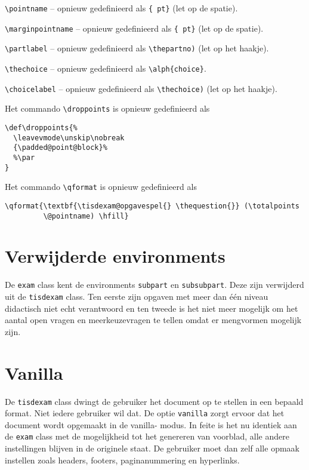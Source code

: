 \documentclass[12pt,dutch,addpoints,fleqn]{tisdexam}
\newcommand\Package[1]{\texttt{#1}}
\newcommand\DocClass[1]{\texttt{#1}}
\newcommand\Option[1]{\texttt{#1}}
\begin{document}
\verb|\pointname| -- opnieuw gedefinieerd als \verb|{ pt}| (let op de spatie).

\verb|\marginpointname| -- opnieuw gedefinieerd als \verb|{ pt}| (let op de spatie).

\verb|\partlabel| -- opnieuw gedefinieerd als \verb|\thepartno)| (let op het haakje).

\verb|\thechoice| -- opnieuw gedefinieerd als \verb|\alph{choice}|.

\verb|\choicelabel| -- opnieuw gedefinieerd als \verb|\thechoice)| (let op het haakje).

\medskip\noindent
Het commando \verb|\droppoints| is opnieuw gedefinieerd als

\begin{lstlisting}
\def\droppoints{%
  \leavevmode\unskip\nobreak
  {\padded@point@block}%
  %\par
}
\end{lstlisting}

\medskip\noindent
Het commando \verb|\qformat| is opnieuw gedefinieerd als

\begin{lstlisting}
\qformat{\textbf{\tisdexam@opgavespel{} \thequestion{}} (\totalpoints
         \@pointname) \hfill}
\end{lstlisting}


\section{Verwijderde environments}
De \DocClass{exam} class kent de environments \Package{subpart} en
\Package{subsubpart}. Deze zijn verwijderd uit de \DocClass{tisdexam} class.
Ten eerste zijn opgaven met meer dan \'{e}\'{e}n niveau didactisch niet
echt verantwoord en ten tweede is het niet meer mogelijk om het aantal
open vragen en meerkeuzevragen te tellen omdat er mengvormen mogelijk zijn.


\section{Vanilla}
\label{sec:vanilla}
De \DocClass{tisdexam} class dwingt de gebruiker het document op te stellen
in een bepaald format. Niet iedere gebruiker wil dat. De optie
\Option{vanilla} zorgt ervoor dat het document wordt opgemaakt in de vanilla-%
modus. In feite is het nu identiek aan de \DocClass{exam} class met de
mogelijkheid tot het genereren van voorblad, alle andere instellingen blijven
in de originele staat. De gebruiker moet dan zelf alle opmaak instellen
zoals headers, footers, paginanummering en hyperlinks.
\end{document}
